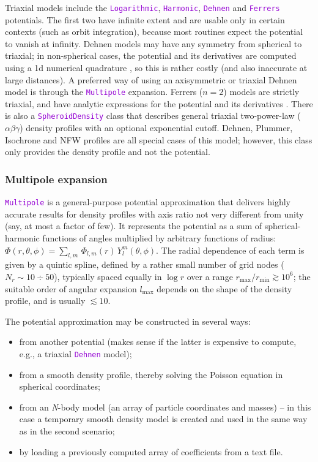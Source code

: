 \documentclass[12pt]{article}
\newcommand{\Nbody}{\textsl{N}-body\xspace}
\newcommand{\ttt}[1]{\textcolor{darkviolet}{\texttt{#1}}}
\begin{document}
Triaxial models include the \ttt{Logarithmic}, \ttt{Harmonic}, \ttt{Dehnen} \cite{Dehnen1993} and \ttt{Ferrers} potentials. The first two have infinite extent and are usable only in certain contexts (such as orbit integration), because most routines expect the potential to vanish at infinity.
Dehnen models may have any symmetry from spherical to triaxial; in non-spherical cases, the potential and its derivatives are computed using a 1d numerical quadrature \cite{MerrittFridman1996}, so this is rather costly (and also inaccurate at large distances). A preferred way of using an axisymmetric or triaxial Dehnen model is through the \ttt{Multipole} expansion. Ferrers ($n=2$) models are strictly triaxial, and have analytic expressions for the potential and its derivatives \cite{Pfenniger1984}.
There is also a \ttt{SpheroidDensity} class that describes general triaxial two-power-law ($\alpha\beta\gamma$) density profiles \cite{Zhao1996} with an optional exponential cutoff. Dehnen, Plummer, Isochrone and NFW profiles are all special cases of this model; however, this class only provides the density profile and not the potential.

\subsubsection{Multipole expansion}  \label{sec:PotentialMultipole}

\ttt{Multipole} is a general-purpose potential approximation that delivers highly accurate results for density profiles with axis ratio not very different from unity (say, at most a factor of few). It represents the potential as a sum of spherical-harmonic functions of angles multiplied by arbitrary functions of radius: $\Phi(r,\theta,\phi) = \sum_{l,m}\, \Phi_{l,m}(r)\, Y_l^m(\theta,\phi)$. The radial dependence of each term is given by a quintic spline, defined by a rather small number of grid nodes ($N_r\sim 10\div 50$), typically spaced equally in $\log r$ over a range $r_\mathrm{max}/r_\mathrm{min} \gtrsim 10^6$; the suitable order of angular expansion $l_\mathrm{max}$ depends on the shape of the density profile, and is usually $\lesssim 10$.

The potential approximation may be constructed in several ways:
\begin{itemize} \setlength{\parskip}{0pt} \setlength{\itemsep}{2pt}
\item from another potential (makes sense if the latter is expensive to compute, e.g., a triaxial \ttt{Dehnen} model);
\item from a smooth density profile, thereby solving the Poisson equation in spherical coordinates;
\item from an \Nbody model (an array of particle coordinates and masses) -- in this case a temporary smooth density model is created and used in the same way as in the second scenario;
\item by loading a previously computed array of coefficients from a text file.
\end{itemize}
\end{document}
